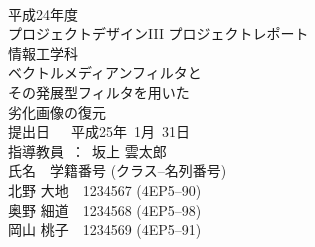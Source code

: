 

\begin{titlepage}
 \begin{center}
  ~\\
  \vspace{1cm}
  {\Large 
  平成24年度\\
 プロジェクトデザインIII プロジェクトレポート\\
情報工学科\\}
  \vspace{1.3in}
  {\Huge \gt 
ベクトルメディアンフィルタと\\
その発展型フィルタを用いた\\
劣化画像の復元\\
  }
  \vspace{2in}
  {\LARGE 
  提出日~~~平成25年~1月~31日\\
  \vspace{0.4in}
  指導教員~：~坂上 雲太郎\\
 \vspace{0.9in}
  氏名　学籍番号 (クラス--名列番号)\\
  \vspace{2mm}
  北野 大地　1234567 (4EP5--90)\\
  奥野 細道　1234568 (4EP5--98)\\
  岡山 桃子　1234569 (4EP5--91)\\
  }
 \end{center}
\end{titlepage}
